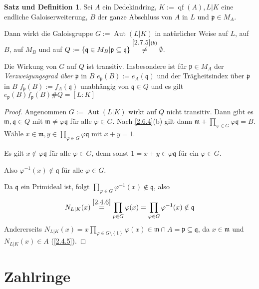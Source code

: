 \documentclass[
twoside=semi,
fontsize=12,
DIV=12, 
cleardoublepage=current,
leqno,
headings=optiontoheadandtoc, 
toc=idx
]{scrbook}
\newcommand{\set}[1]{\left\{ #1 \right\}}
\DeclareMathOperator{\Aut}{Aut}
\DeclareMathOperator{\qf}{qf}
\theoremstyle{definition}
\newtheorem{satz-def}[definition]{Satz und Definition}
\begin{document}
 	\begin{satz-def}\label{2.7.6}\hfill\newline
 		Sei $A$ ein Dedekindring, $K:= \qf(A), L|K$ eine endliche Galoiserweiterung, $B$ der ganze Abschluss von $A$ in $L$ und $\mathfrak{p} \in M_A$. 
 		
 		\medskip\noindent 
 		Dann wirkt die Galoisgruppe $G:= \Aut(L|K)$ in nat\"urlicher Weise auf $L$, auf $B$, auf $M_B$ und auf $Q:= \set{\mathfrak{q} \in M_B| \mathfrak{p} \subseteq \mathfrak{q}} \overset{\ref{2.7.5}(b)}{\neq} \emptyset$.
 		
 		Die Wirkung von $G$ auf $Q$ ist transitiv. Insbesondere ist f\"ur $\mathfrak{p} \in M_A$ der \emph{Verzweigungsgrad \"uber} $\mathfrak{p}$ in $B$ $e_\mathfrak{p}(B) := e_A(\mathfrak{q})$ und der Tr\"agheitsindex \"uber $\mathfrak{p}$ in $B$ $f_\mathfrak{p}(B) := f_A(\mathfrak{q})$ unabh\"angig von $\mathfrak{q} \in Q$ und es gilt $e_\mathfrak{p}(B)f_\mathfrak{p}(B)\#Q = [L:K]$
 		
 		\begin{proof}
 			Angenommen $G:= \Aut(L|K)$ wirkt auf $Q$ nicht transitiv. Dann gibt es \linebreak $\mathfrak{m}, \mathfrak{q} \in Q$ mit $\mathfrak{m} \neq \varphi \mathfrak{q}$ f\"ur alle $\varphi \in G$. Nach \ref{2.6.4}(b) gilt dann $\mathfrak{m} + \prod_{\varphi \in G} \varphi \mathfrak{q} = B$. W\"ahle $x \in \mathfrak{m}, y \in \prod_{\varphi \in G} \varphi \mathfrak{q}$  mit $x+y = 1$.
 			
 			Es gilt $x \notin \varphi \mathfrak{q}$ f\"ur alle $\varphi \in G$, denn sonst $1 = x + y \in \varphi \mathfrak{q}$ f\"ur ein $\varphi \in G$.
 			\newline
 			
 			Also $\varphi^{-1}(x) \notin \mathfrak{q}$ f\"ur alle $\varphi \in G$.
 			
 			Da $\mathfrak{q}$ ein Primideal ist, folgt $\prod_{\varphi \in G} \varphi^{-1}(x) \notin \mathfrak{q} $, also 
 			\[N_{L|K}(x) \overset{\ref{2.4.6}}{=} \prod_{p \in G} \varphi(x) = \prod_{\varphi \in G} \varphi^{-1}(x) \notin \mathfrak{q}\]
 			Andererseits $N_{L|K}(x) = x \prod_{\varphi \in G \setminus \set{1}} \varphi(x) \in \mathfrak{m} \cap A = \mathfrak{p} \subseteq \mathfrak{q}$, da $x \in \mathfrak{m}$ und $N_{L|K}(x) \in A$ (\ref{2.4.5}).
 		\end{proof}
 	\end{satz-def}
 
 	\newpage
 	\chapter[tocentry={Zahlringe}]{Zahlringe}
\end{document}
